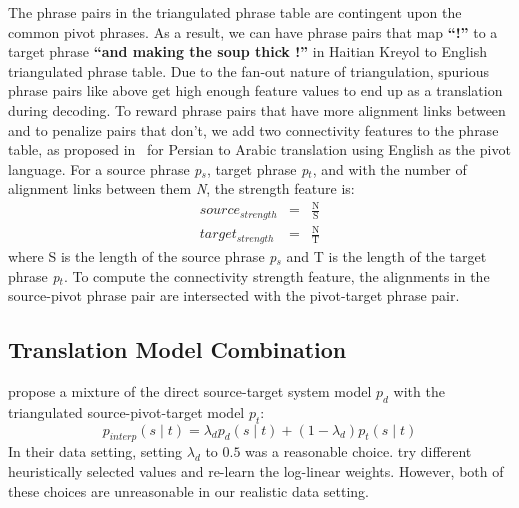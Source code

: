 \documentclass[11pt]{article}
\begin{document}
\smallskip
 \label{sec:strength} The phrase pairs in the triangulated phrase table are contingent upon the common pivot phrases. As a result, we can have phrase pairs that map \textbf{``!''} to a target phrase \textbf{``and making the soup thick !''} in Haitian Kreyol to English triangulated phrase table. Due to the fan-out nature of triangulation, spurious phrase pairs like above get high enough feature values to end up as a translation during decoding. To reward phrase pairs that have more alignment links between and to penalize pairs that don't, we add two connectivity features to the phrase table, as proposed in~\cite{Ahmed:13} for Persian to Arabic translation using English as the pivot language. For a source phrase \emph{p$_s$}, target phrase \emph{p$_t$}, and with the number of alignment links between them \emph{N}, the strength feature is:
	\begin{eqnarray*}
		source_{strength} &=& \frac{\mathrm{N}}{\mathrm{S}} \\
		target_{strength} &=& \frac{\mathrm{N}}{\mathrm{T}}
	\end{eqnarray*}
	where S is the length of the source phrase \emph{p$_s$} and T is the length of the target phrase \emph{p$_t$}. To compute the connectivity strength feature, the alignments in the source-pivot phrase pair are intersected with the pivot-target phrase pair. 

\subsection{Translation Model Combination}
\label{sec:interpolation}
	\cite{Cohn:07} propose a mixture of the direct source-target system model $p_d$ with the triangulated source-pivot-target model $p_t$: 
	\begin{equation} \label{eq:interpolation}
		p_{interp}(s \mid t) = \lambda_{d} p_{d}(s \mid t) + (1 - \lambda_{d}) p_{t}(s \mid t)
	\end{equation}
	In their data setting, setting $\lambda_{d}$ to $0.5$ was a reasonable choice. \cite{Nakov:12} try different heuristically selected values and re-learn the log-linear weights. However, both of these choices are unreasonable in our realistic data setting.
		
\end{document}
